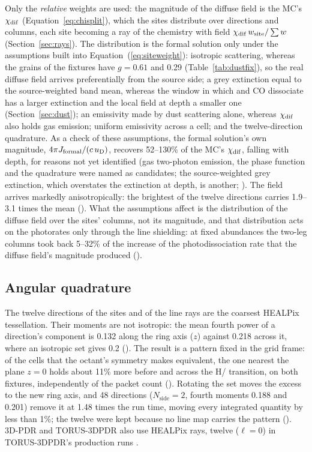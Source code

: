 Only the \emph{relative} weights are used: the magnitude of the diffuse field
is the MC's $\chi_{\mathrm{dif}}$ (Equation~\ref{eq:chisplit}), which the sites distribute
over directions and columns, each site becoming a ray of the chemistry with
field $\chi_{\mathrm{dif}}\,w_{\mathrm{site}}/\sum w$ (Section~\ref{sec:rays}). The
distribution is the formal solution only under the assumptions built into
Equation~(\ref{eq:siteweight}): isotropic scattering, whereas the grains of
the fixtures have $g=0.61$ and 0.29 (Table~\ref{tab:dustfix}), so the real
diffuse field arrives preferentially from the source side; a grey extinction
equal to the source-weighted band mean, whereas the window in which \Htwo{} and
CO dissociate has a larger extinction and the local field at depth a smaller
one (Section~\ref{sec:dust}); an emissivity made by dust scattering alone,
whereas $\chi_{\mathrm{dif}}$ also holds gas emission; uniform emissivity across a cell; and
the twelve-direction quadrature. As a check of these assumptions, the formal
solution's own magnitude, $4\pi J_{\mathrm{formal}}/(c\,u_{\mathrm{D}})$, recovers 52--130\%
of the MC's $\chi_{\mathrm{dif}}$, falling with depth, for reasons not yet identified (gas
two-photon emission, the phase function and the quadrature were named as
candidates; the source-weighted grey extinction, which overstates the
extinction at depth, is another; ). The field arrives markedly
anisotropically: the brightest of the twelve directions carries 1.9--3.1 times
the mean (). What the assumptions affect is the distribution of
the diffuse field over the sites' columns, not its magnitude, and that
distribution acts on the photorates only through the line shielding: at fixed
abundances the two-leg columns took back 5--32\% of the increase of the \Htwo{}
photodissociation rate that the diffuse field's magnitude produced
().

\subsection{Angular quadrature}
\label{sec:healpix}

The twelve directions of the sites and of the line rays are the coarsest
HEALPix tessellation. Their moments are not isotropic: the mean fourth power
of a direction's component is 0.132 along the ring axis ($z$) against 0.218
across it, where an isotropic set gives 0.2 (). The result is a
pattern fixed in the grid frame: of the cells that the octant's symmetry makes
equivalent, the one nearest the plane $z=0$ holds about 11\% more \Htwo{}
before and across the H/\Htwo{} transition, on both fixtures, independently of
the packet count (). Rotating the set moves the excess to the new
ring axis, and 48 directions ($N_{\mathrm{side}}=2$, fourth moments 0.188 and
0.201) remove it at 1.48 times the run time, moving every integrated quantity
by less than 1\%; the twelve were kept because no line map carries the pattern
(). 3D-PDR and TORUS-3DPDR also use HEALPix rays, twelve
($\ell=0$) in TORUS-3DPDR's production runs \citep{Bisbas2012,Bisbas2015}.

